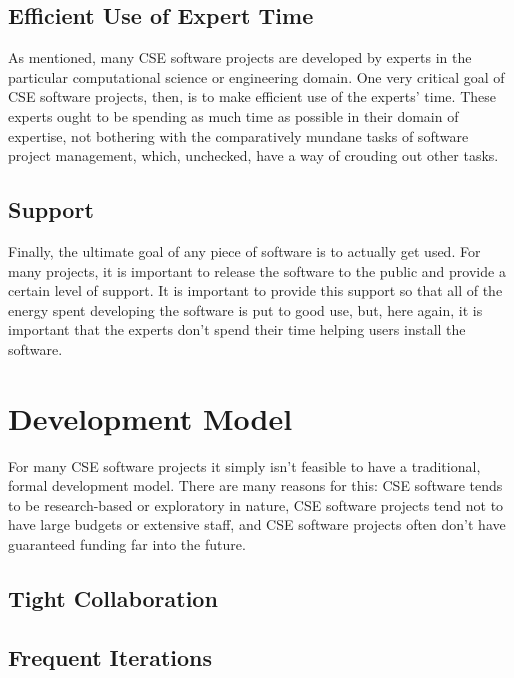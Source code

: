 \documentclass[12pt,relax]{article}
\begin{document}
\subsection{Efficient Use of Expert Time}
As mentioned, many CSE software projects are developed by experts in the 
particular computational science or engineering domain.  One very critical 
goal of CSE software projects, then, is to make efficient use of the experts' 
time.  These experts ought to be spending as much time as possible in their 
domain of expertise, not bothering with the comparatively mundane tasks of 
software project management, which, unchecked, have a way of crouding out 
other tasks.  

\subsection{Support}
Finally, the ultimate goal of any piece of software is to actually get used.  
For many projects, it is important to release the software to the public and 
provide a certain level of support.  It is important to provide this support 
so that all of the energy spent developing the software is put to good use, 
but, here again, it is important that the experts don't spend their time 
helping users install the software.

\clearpage


\section{Development Model}
\label{Section:Development Model}

For many CSE software projects it simply isn't feasible to have a traditional, 
formal development model.  There are many reasons for this:  CSE software tends
to be research-based or exploratory in nature, CSE software projects tend not
to have large budgets or extensive staff, and CSE software projects often don't
have guaranteed funding far into the future.

\subsection{Tight Collaboration}

\subsection{Frequent Iterations}
\end{document}
